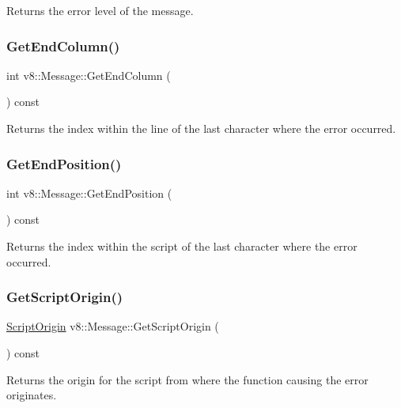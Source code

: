 Returns the error level of the message. \mbox{\label{classv8_1_1Message_ae188ca2457adbb3628681782bc757dc8}} 
\subsubsection{\texorpdfstring{Get\+End\+Column()}{GetEndColumn()}}
{\footnotesize\ttfamily int v8\+::\+Message\+::\+Get\+End\+Column (\begin{DoxyParamCaption}{ }\end{DoxyParamCaption}) const}

Returns the index within the line of the last character where the error occurred. \mbox{\label{classv8_1_1Message_a9a6c55ffea2eb6841d67afec40300641}} 
\subsubsection{\texorpdfstring{Get\+End\+Position()}{GetEndPosition()}}
{\footnotesize\ttfamily int v8\+::\+Message\+::\+Get\+End\+Position (\begin{DoxyParamCaption}{ }\end{DoxyParamCaption}) const}

Returns the index within the script of the last character where the error occurred. \mbox{\label{classv8_1_1Message_a3530ffb45b802c46a47349e610402a3c}} 
\subsubsection{\texorpdfstring{Get\+Script\+Origin()}{GetScriptOrigin()}}
{\footnotesize\ttfamily \mbox{\hyperlink{classv8_1_1ScriptOrigin}{Script\+Origin}} v8\+::\+Message\+::\+Get\+Script\+Origin (\begin{DoxyParamCaption}{ }\end{DoxyParamCaption}) const}

Returns the origin for the script from where the function causing the error originates. \mbox{\label{classv8_1_1Message_a843084f6838bd58d5fd888ab460cb2d4}} 
